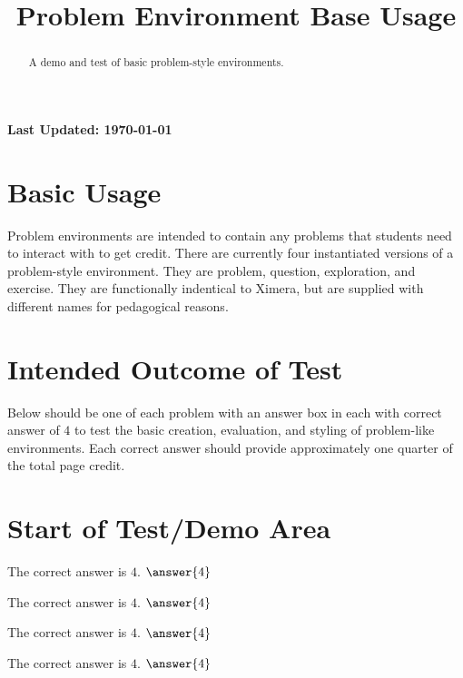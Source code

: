\documentclass{ximera}
\title{Problem Environment Base Usage}
\begin{document}
\begin{abstract}
    A demo and test of basic problem-style environments.
\end{abstract}
\maketitle

{{\Huge \bfseries Last Updated: \today}} \\


\section{Basic Usage}
Problem environments are intended to contain any problems that students need to interact with to get credit.
There are currently four instantiated versions of a problem-style environment. They are problem, question, exploration, and exercise.
They are functionally indentical to Ximera, but are supplied with different names for pedagogical reasons.

\section{Intended Outcome of Test}
Below should be one of each problem with an answer box in each with correct answer of $4$ 
to test the basic creation, evaluation, and styling of problem-like environments. 
Each correct answer should provide approximately one quarter of the total page credit.

\section{Start of Test/Demo Area}
\numberedProblemstrue

\begin{problem}
    The correct answer is $4$. $\answer{4}$
\end{problem}

\begin{exercise}
    The correct answer is $4$. $\answer{4}$
\end{exercise}

\begin{question}
    The correct answer is $4$. $\answer{4}$
\end{question}

\begin{exploration}
    The correct answer is $4$. $\answer{4}$
\end{exploration}

\hrulefill
\end{document}
